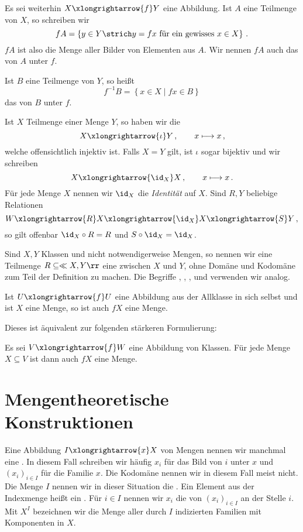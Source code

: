 Es sei weiterhin $X\xlongrightarrow{f}Y$ eine Abbildung. Ist $A$ eine Teilmenge von $X$, so schreiben wir 
\[fA=\left\{y\in Y\strich y=fx\text{ für ein gewisses }x\in X\right\}\,.\]
$fA$ ist also die Menge aller Bilder von Elementen aus $A$. Wir nennen $fA$ auch das  von $A$ unter $f$.

Ist $B$ eine Teilmenge von $Y$, so heißt
\[
f^{-1}B=\left\{x\in X\mid fx\in B\right\}
\]
das  von $B$ unter $f$.

\begin{example}
Ist $X$ Teilmenge einer Menge $Y$, so haben wir die 
\[
X\xlongrightarrow{\iota}Y\,,\qquad x\longmapsto x\,,
\]
welche offensichtlich injektiv ist. Falls $X=Y$ gilt, ist $\iota$ sogar bijektiv und wir schreiben
\[
X\xlongrightarrow{\id_X}X\,,\qquad x\longmapsto x\,.
\]
Für jede Menge $X$ nennen wir $\id_X$ die \emph{Identität} auf $X$. Sind $R,Y$ beliebige Relationen
\[
W\xlongrightarrow{R}X\xlongrightarrow{\id_X}X\xlongrightarrow{S}Y\,,
\]
so gilt offenbar $\id_X\circ R=R$ und $S\circ\id_X=\id_X$.
\end{example}

Sind $X,Y$ Klassen und nicht notwendigerweise Mengen, so nennen wir eine Teilmenge $R\subseteq\ll X,Y\rr$ eine  zwischen $X$ und $Y$, ohne Domäne und Kodomäne zum Teil der Definition zu machen. Die Begriffe , , ,  und  verwenden wir analog.

\begin{axiom}
Ist $U\xlongrightarrow{f}U$ eine Abbildung aus der Allklasse in sich selbst und ist $X$ eine Menge, so ist auch $fX$ eine Menge.
\end{axiom}

Dieses  ist äquivalent zur folgenden stärkeren Formulierung:

\begin{task}
Es sei $V\xlongrightarrow{f}W$ eine Abbildung von Klassen. Für jede Menge $X\subseteq V$ ist dann auch $fX$ eine Menge. 
\end{task}

\section{Mengentheoretische Konstruktionen}

Eine Abbildung $I\xlongrightarrow{x}X$ von Mengen nennen wir manchmal eine . In diesem Fall schreiben wir häufig $x_i$ für das Bild von $i$ unter $x$ und $(x_i)_{i\in I}$ für die Familie $x$. Die Kodomäne nennen wir in diesem Fall meist nicht. Die Menge $I$ nennen wir in dieser Situation die . Ein Element aus der Indexmenge heißt ein . Für $i\in I$ nennen wir $x_i$ die  von $(x_i)_{i\in I}$ an der Stelle $i$. Mit $X^I$ bezeichnen wir die Menge aller durch $I$ indizierten Familien mit Komponenten in $X$. 

